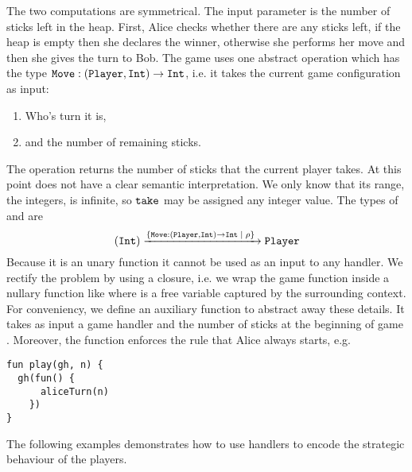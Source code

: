 The two computations are symmetrical. The input parameter  is the number of sticks left in the heap. First, Alice checks whether there are any sticks left, if the heap is empty then she declares  the winner, otherwise she performs her move and then she gives the turn to Bob.
The game uses one abstract operation  which has the type $\texttt{Move} : (\texttt{Player}, \texttt{Int}) \to \texttt{Int}$, i.e. it takes the current game configuration as input:
\begin{enumerate}
  \item Who's turn it is,
  \item and the number of remaining sticks.
\end{enumerate} 
The operation  returns the number of sticks that the current player takes. At this point  does not have a clear semantic interpretation. We only know that its range, the integers, is infinite, so $\texttt{take}$ may be assigned any integer value.
The types of  and  are
\[ (\texttt{Int}) \xrightarrow{\{\texttt{Move}:(\texttt{Player},\texttt{Int}) \to \texttt{Int} \; | \; \rho\}\;} \texttt{Player} \]
Because it is an unary function it cannot be used as an input to any handler. We rectify the problem by using a closure, i.e. we wrap the game function inside a nullary function like  where  is a free variable captured by the surrounding context.
For conveniency, we define an auxiliary function  to abstract away these details. It takes as input a game handler  and the number of sticks at the beginning of game . Moreover, the function  enforces the rule that Alice always starts, e.g.
\begin{lstlisting}[style=links]
fun play(gh, n) {
  gh(fun() {
      aliceTurn(n)
    })
}
\end{lstlisting}
The following examples demonstrates how to use handlers to encode the strategic behaviour of the players.
